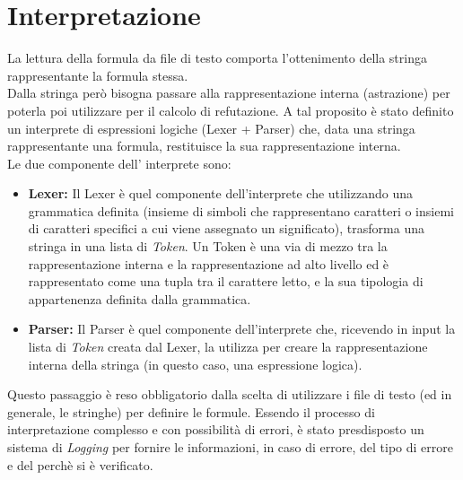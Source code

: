 \documentclass[\main/tesi.tex]{subfiles}
\begin{document}
\section{Interpretazione}
La lettura della formula da file di testo comporta l'ottenimento della stringa rappresentante la formula stessa. \\
Dalla stringa però bisogna passare alla rappresentazione interna (astrazione) per poterla poi utilizzare per il calcolo di refutazione. A tal proposito è stato definito un interprete di espressioni logiche (Lexer + Parser) che, data una stringa rappresentante una formula, restituisce la sua rappresentazione interna. \\
Le due componente dell' interprete sono:
\begin{itemize}
    \item \textbf{Lexer:} Il Lexer è quel componente dell'interprete che utilizzando una grammatica definita (insieme di simboli che rappresentano caratteri o insiemi di caratteri specifici a cui viene assegnato un significato), trasforma una stringa in una lista di \textit{Token}. Un Token è una via di mezzo tra la rappresentazione interna e la rappresentazione ad alto livello ed è rappresentato come una tupla tra il carattere letto, e la sua tipologia di appartenenza definita dalla grammatica.
    \item \textbf{Parser:} Il Parser è quel componente dell'interprete che, ricevendo in input la lista di \textit{Token} creata dal Lexer, la utilizza per creare la rappresentazione interna della stringa (in questo caso, una espressione logica).
\end{itemize}
Questo passaggio è reso obbligatorio dalla scelta di utilizzare i file di testo (ed in generale, le stringhe) per definire le formule.
Essendo il processo di interpretazione complesso e con possibilità di errori, è stato presdisposto un sistema di \textit{Logging} per fornire le informazioni, in caso di errore, del tipo di errore e del perchè si è verificato. \\
\end{document}
